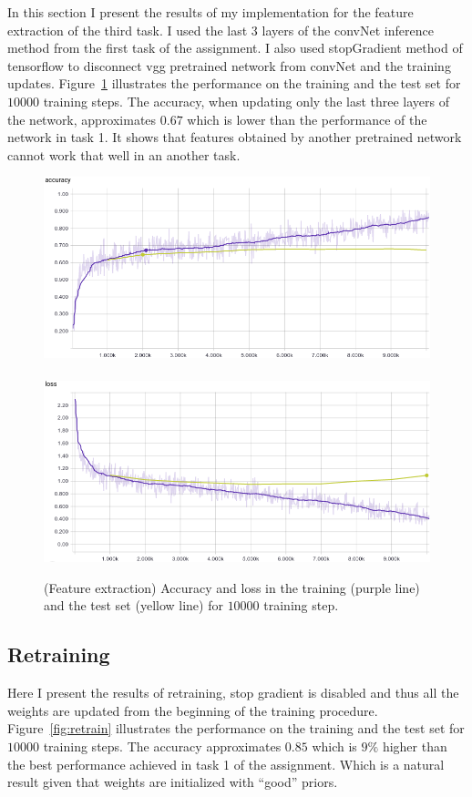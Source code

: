 \documentclass{article}
\begin{document}
In this section I present the results of my implementation for the feature extraction of the third task.
I used the last 3 layers of the convNet inference method from the first task of the assignment.
I also used stopGradient method of tensorflow to disconnect vgg pretrained network from convNet and the training updates.
Figure~\ref{fig:extra} illustrates the performance on the training and the test set for $10000$ training steps.
The accuracy, when updating only the last three layers of the network, approximates $0.67$ which is lower than the performance of the network in task 1.
It shows that features obtained by another pretrained network cannot work that well in an another task.


\begin{figure}[h!]
\centering
\includegraphics[width=12.2cm]{acc-transfer.png}\	
\includegraphics[width=12.2cm]{loss-transfer.png}
\caption{(Feature extraction) Accuracy and loss in the training (purple line) and the test set (yellow line) for $10000$ training step.}
\label{fig:extra}
\end{figure}




\subsection{Retraining}

Here I present the results of retraining, stop gradient is disabled and thus all the weights are updated from the beginning of the training procedure.
Figure~\ref{fig:retrain} illustrates the performance on the training and the test set for $10000$ training steps.
The accuracy approximates $0.85$ which is $9\%$ higher than the best performance achieved in task 1 of the assignment.
Which is a natural result given that weights are initialized with ``good'' priors.
\end{document}
